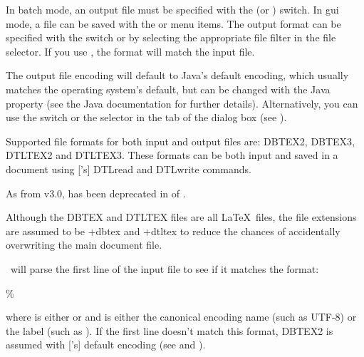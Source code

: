 In batch mode, an output file must be specified with the
 (or ) switch. In \gls{gui} mode, a file
can be saved with the  or  menu
items. The output format can be specified with the
 switch or by selecting the appropriate file
filter in the  file selector. If you use
, the format will match the input file.

The output file encoding will default to Java's default
encoding, which usually matches the operating system's default, but
can be changed with the Java  property (see the
Java documentation for further details). Alternatively, you can use
the  switch or the selector in the
 tab of the 
dialog box (see ).

Supported file formats for both input and output files are:
\gls{DBTEX2}, \gls{DBTEX3}, \gls{DTLTEX2} and \gls{DTLTEX3}.
These formats can be both input and saved in a document
using ['s] \gls{DTLread} and \gls{DTLwrite} commands.

\begin{information}
As from  v3.0,  has been deprecated
in  of
.
\end{information}

Although the DBTEX and DTLTEX files are all \LaTeX\ files, the file 
extensions are assumed to be \ext+{dbtex} and \ext+{dtltex} to
reduce the chances of accidentally overwriting the main document
file.

\appname\ will parse the first line of the input file to see if it
matches the format:
\begin{compactcodebox}
\%  
\end{compactcodebox}
where  is either  or  and
 is either the canonical encoding name (such as
UTF-8) or the  label (such as ).
If the first line doesn't match this format, \gls{DBTEX2} is
assumed with ['s] default encoding (see
 and ).

